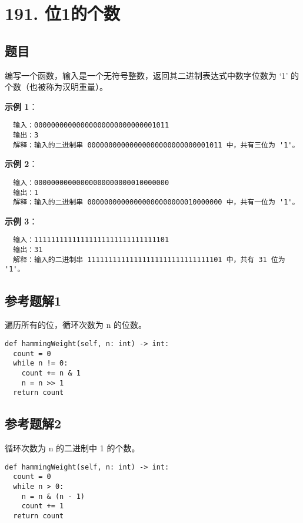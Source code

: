 \newpage
\section{191. 位1的个数}
\label{leetcode:191}

\subsection{题目}

编写一个函数，输入是一个无符号整数，返回其二进制表达式中数字位数为 ‘1’ 的个数（也被称为汉明重量）。

\textbf{示例 1}：

\begin{verbatim}
  输入：00000000000000000000000000001011
  输出：3
  解释：输入的二进制串 00000000000000000000000000001011 中，共有三位为 '1'。
\end{verbatim}

\textbf{示例 2}：

\begin{verbatim}
  输入：00000000000000000000000010000000
  输出：1
  解释：输入的二进制串 00000000000000000000000010000000 中，共有一位为 '1'。
\end{verbatim}

\textbf{示例 3}：

\begin{verbatim}
  输入：11111111111111111111111111111101
  输出：31
  解释：输入的二进制串 11111111111111111111111111111101 中，共有 31 位为 '1'。
\end{verbatim}

\subsection{参考题解1}

遍历所有的位，循环次数为 n 的位数。

\begin{verbatim}
def hammingWeight(self, n: int) -> int:
  count = 0
  while n != 0:
    count += n & 1
    n = n >> 1
  return count
\end{verbatim}

\subsection{参考题解2}

循环次数为 n 的二进制中 1 的个数。

\begin{verbatim}
def hammingWeight(self, n: int) -> int:
  count = 0
  while n > 0:
    n = n & (n - 1)
    count += 1
  return count
\end{verbatim}
